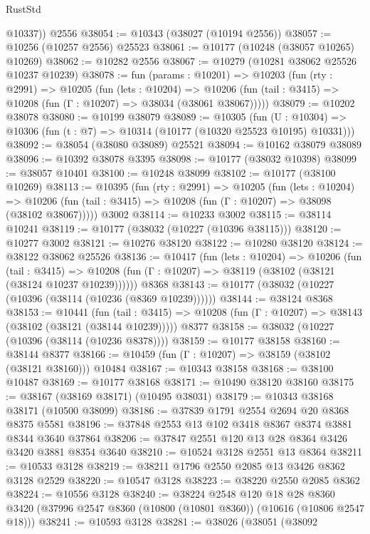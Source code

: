 \begin{lexlean}{RustStd}
\begin{coremodule}
        @10337))
    @2556
@38054 := @10343 (@38027 (@10194 @2556))
@38057 := @10256 (@10257 @2556) @25523
@38061 := @10177 (@10248 (@38057 @10265) @10269)
@38062 := @10282 @2556
@38067 := @10279 (@10281 @38062 @25526 @10237 @10239)
@38078 := fun (params : @10201) =>
  @10203
    (fun (rty : @2991) =>
    @10205
      (fun (lets : @10204) =>
      @10206 (fun (tail : @3415) => @10208 (fun (Γ : @10207) => @38034 (@38061 @38067)))))
@38079 := @10202 @38078
@38080 := @10199 @38079
@38089 := @10305
    (fun (U : @10304) => @10306 (fun (t : @7) => @10314 (@10177 (@10320 @25523 @10195) @10331)))
@38092 := @38054 (@38080 @38089) @25521
@38094 := @10162 @38079 @38089
@38096 := @10392 @38078 @3395
@38098 := @10177 (@38032 @10398)
@38099 := @38057 @10401
@38100 := @10248 @38099
@38102 := @10177 (@38100 @10269)
@38113 := @10395
    (fun (rty : @2991) =>
    @10205
      (fun (lets : @10204) =>
      @10206 (fun (tail : @3415) => @10208 (fun (Γ : @10207) => @38098 (@38102 @38067)))))
    @3002
@38114 := @10233 @3002
@38115 := @38114 @10241
@38119 := @10177 (@38032 (@10227 (@10396 @38115)))
@38120 := @10277 @3002
@38121 := @10276 @38120
@38122 := @10280 @38120
@38124 := @38122 @38062 @25526
@38136 := @10417
    (fun (lets : @10204) =>
    @10206
      (fun (tail : @3415) =>
      @10208 (fun (Γ : @10207) => @38119 (@38102 (@38121 (@38124 @10237 @10239))))))
    @8368
@38143 := @10177 (@38032 (@10227 (@10396 (@38114 (@10236 (@8369 @10239))))))
@38144 := @38124 @8368
@38153 := @10441
    (fun (tail : @3415) => @10208 (fun (Γ : @10207) => @38143 (@38102 (@38121 (@38144 @10239)))))
    @8377
@38158 := @38032 (@10227 (@10396 (@38114 (@10236 @8378))))
@38159 := @10177 @38158
@38160 := @38144 @8377
@38166 := @10459 (fun (Γ : @10207) => @38159 (@38102 (@38121 @38160))) @10484
@38167 := @10343 @38158
@38168 := @38100 @10487
@38169 := @10177 @38168
@38171 := @10490 @38120 @38160
@38175 := @38167 (@38169 @38171) (@10495 @38031)
@38179 := @10343 @38168 @38171 (@10500 @38099)
@38186 := @37839 @1791 @2554 @2694 @20 @8368 @8375 @5581
@38196 := @37848 @2553 @13 @102 @3418 @8367 @8374 @3881 @8344 @3640 @37864
@38206 := @37847 @2551 @120 @13 @28 @8364 @3426 @3420 @3881 @8354 @3640
@38210 := @10524 @3128 @2551 @13 @8364
@38211 := @10533 @3128
@38219 := @38211 @1796 @2550 @2085 @13 @3426 @8362 @3128 @2529
@38220 := @10547 @3128
@38223 := @38220 @2550 @2085 @8362
@38224 := @10556 @3128
@38240 := @38224
    @2548
    @120
    @18
    @28
    @8360
    @3420
    (@37996 @2547 @8360 (@10800 (@10801 @8360)) (@10616 (@10806 @2547 @18)))
@38241 := @10593 @3128
@38281 := @38026
    (@38051
      (@38092

\end{coremodule}
\end{lexlean}
